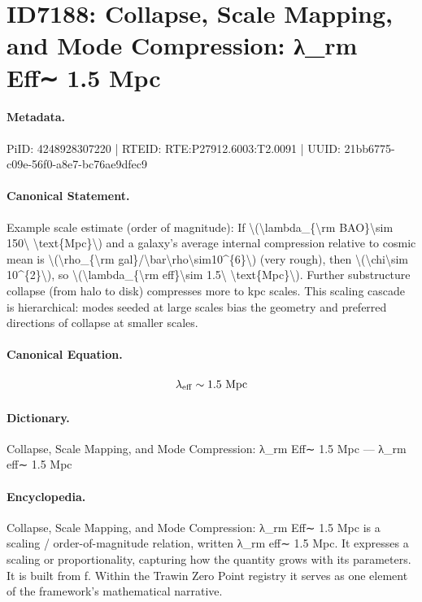 \section*{ID7188: Collapse, Scale Mapping, and Mode Compression: λ\_rm Eff∼ 1.5 Mpc}
\paragraph{Metadata.}
PiID: 4248928307220 | RTEID: RTE:P27912.6003:T2.0091 | UUID: 21bb6775-c09e-56f0-a8e7-bc76ae9dfec9

\paragraph{Canonical Statement.}
Example scale estimate (order of magnitude): If \textbackslash{}(\textbackslash{}lambda\_\{\textbackslash{}rm BAO\}\textbackslash{}sim 150\textbackslash{} \textbackslash{}text\{Mpc\}\textbackslash{}) and a galaxy's average internal compression relative to cosmic mean is \textbackslash{}(\textbackslash{}rho\_\{\textbackslash{}rm gal\}/\textbackslash{}bar\textbackslash{}rho\textbackslash{}sim10\textasciicircum{}\{6\}\textbackslash{}) (very rough), then \textbackslash{}(\textbackslash{}chi\textbackslash{}sim 10\textasciicircum{}\{2\}\textbackslash{}), so \textbackslash{}(\textbackslash{}lambda\_\{\textbackslash{}rm eff\}\textbackslash{}sim 1.5\textbackslash{} \textbackslash{}text\{Mpc\}\textbackslash{}). Further substructure collapse (from halo to disk) compresses more to kpc scales. This scaling cascade is hierarchical: modes seeded at large scales bias the geometry and preferred directions of collapse at smaller scales.

\paragraph{Canonical Equation.}
\[
\lambda_{\rm eff}\sim 1.5\ \text{Mpc}
\]

\paragraph{Dictionary.}
Collapse, Scale Mapping, and Mode Compression: λ\_rm Eff∼ 1.5 Mpc — λ\_rm eff∼ 1.5 Mpc

\paragraph{Encyclopedia.}
Collapse, Scale Mapping, and Mode Compression: λ\_rm Eff∼ 1.5 Mpc is a scaling / order-of-magnitude relation, written λ\_rm eff∼ 1.5 Mpc. It expresses a scaling or proportionality, capturing how the quantity grows with its parameters. It is built from f. Within the Trawin Zero Point registry it serves as one element of the framework's mathematical narrative.
